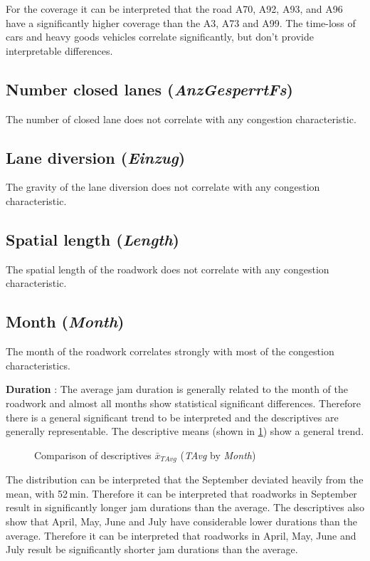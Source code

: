 For the coverage it can be interpreted that the road A70, A92, A93, and A96 have a significantly higher coverage than the A3, A73 and A99. The time-loss of cars and heavy goods vehicles correlate significantly, but don't provide interpretable differences.

\subsection{Number closed lanes (\textit{AnzGesperrtFs})}
The number of closed lane does not correlate with any congestion characteristic.

\subsection{Lane diversion (\textit{Einzug})}
The gravity of the lane diversion does not correlate with any congestion characteristic.

\subsection{Spatial length (\textit{Length})}
The spatial length of the roadwork does not correlate with any congestion characteristic. 

\subsection{Month (\textit{Month})}
The month of the roadwork correlates strongly with most of the congestion characteristics. 

\textbf{Duration} : The average jam duration is generally related to the month of the roadwork and almost all months show statistical significant differences. Therefore there is a general significant trend to be interpreted and the descriptives are generally representable. The descriptive means (shown in \cref{fig:arbis_summary_month_duration}) show a general trend.
\begin{figure}[ht!]
	\data
	\pgfplotstablesort[sort key=gMeanSAvg, sort cmp=float >]{\datasorted}{\data}
	\tiny
	\centering
	\caption{Comparison of descriptives $\bar{x}_{TAvg}$ (\textit{TAvg} by \textit{Month})}
	\label{fig:arbis_summary_month_duration}
\end{figure}
The distribution can be interpreted that the September deviated heavily from the mean, with 52\,min. Therefore it can be interpreted that roadworks in September result in significantly longer jam durations than the average. The descriptives also show that April, May, June and July have considerable lower durations than the average. Therefore it can be interpreted that roadworks in April, May, June and July result be significantly shorter jam durations than the average. 

